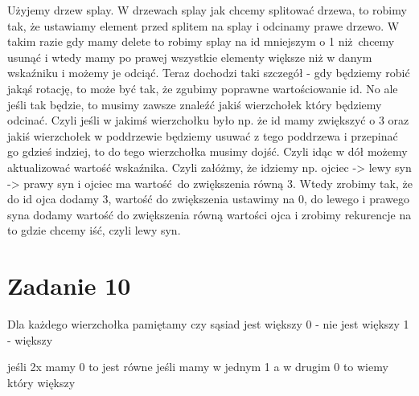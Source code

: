 \documentclass[12pt]{article}
\begin{document}
Użyjemy drzew splay. W drzewach splay jak chcemy splitować drzewa, to robimy tak, że ustawiamy element przed splitem na splay i odcinamy prawe drzewo. W takim razie gdy mamy delete to robimy splay na id mniejszym o 1 niż chcemy usunąć i wtedy mamy po prawej wszystkie elementy większe niż w danym wskaźniku i możemy je odciąć. 
Teraz dochodzi taki szczegół - gdy będziemy robić jakąś rotację, to może być tak, że zgubimy poprawne wartościowanie id. No ale jeśli tak będzie, to musimy zawsze znaleźć jakiś wierzchołek który będziemy odcinać. Czyli jeśli w jakimś wierzchołku było np. że id mamy zwiększyć o 3 oraz jakiś wierzchołek w poddrzewie będziemy usuwać z tego poddrzewa i przepinać go gdzieś indziej, to do tego wierzchołka musimy dojść. Czyli idąc w dół możemy aktualizować wartość wskaźnika.
Czyli załóżmy, że idziemy np. ojciec -> lewy syn -> prawy syn i ojciec ma wartość do zwiększenia równą 3.
Wtedy zrobimy tak, że do id ojca dodamy 3, wartość do zwiększenia ustawimy na 0, do lewego i prawego syna dodamy wartość do zwiększenia równą wartości ojca i zrobimy rekurencje na to gdzie chcemy iść, czyli lewy syn.



\section{Zadanie 10}


Dla każdego wierzchołka pamiętamy czy sąsiad jest większy
0 - nie jest większy
1 - większy 

jeśli 2x mamy 0 to jest równe 
jeśli mamy w jednym 1 a w drugim 0 to wiemy który większy

\egroup
\end{document}
